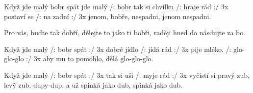 \begin{TEXT}{Když jde malý bobr spát}
\SLOKA {} jde malý /: bobr 
tak si chvilku /: hraje rád :/ 3x
postaví se /: na zadní :/ 3x
jenom, bobře, nespadni, jenom nespadni.

\REFREN Pro vás, buďte tak dobří, dělejte to jako ti bobři,
raději hned  do násdujte za bo.

\SLOKA Když jde malý /: bobr spát :/ 3x
dobré jídlo /: jídá rád  :/ 3x
pije mléko, /: glo-glo-glo :/ 3x
aby mu to pomohlo, dělá glo-glo-glo.

\SLOKA Když jde malý /: bobr spát :/ 3x
tak si uši /: myje rád :/ 3x
vyčistí si pravý zub, levý zub, dupy-dup,
a už spinká jako dub, spinká jako dub.
\end{TEXT}